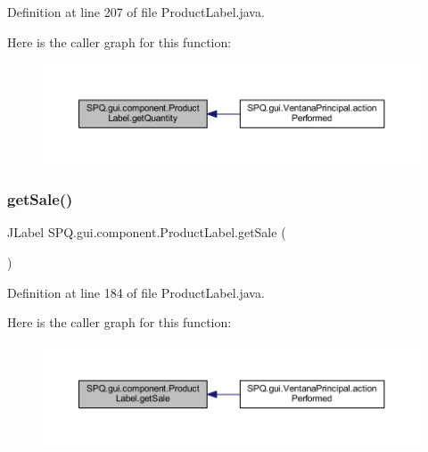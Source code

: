 Definition at line 207 of file Product\+Label.\+java.

Here is the caller graph for this function\+:\nopagebreak
\begin{figure}[H]
\begin{center}
\leavevmode
\includegraphics[width=350pt]{class_s_p_q_1_1gui_1_1component_1_1_product_label_adcfdea4cb072291bea24728bf75aac10_icgraph}
\end{center}
\end{figure}
\mbox{\label{class_s_p_q_1_1gui_1_1component_1_1_product_label_a7841fcd56578df74918d99fa2b705e24}} 
\subsubsection{\texorpdfstring{get\+Sale()}{getSale()}}
{\footnotesize\ttfamily J\+Label S\+P\+Q.\+gui.\+component.\+Product\+Label.\+get\+Sale (\begin{DoxyParamCaption}{ }\end{DoxyParamCaption})}



Definition at line 184 of file Product\+Label.\+java.

Here is the caller graph for this function\+:\nopagebreak
\begin{figure}[H]
\begin{center}
\leavevmode
\includegraphics[width=350pt]{class_s_p_q_1_1gui_1_1component_1_1_product_label_a7841fcd56578df74918d99fa2b705e24_icgraph}
\end{center}
\end{figure}
\mbox{\label{class_s_p_q_1_1gui_1_1component_1_1_product_label_ac3981c38ea018be3253d133cd1da8b83}} 
